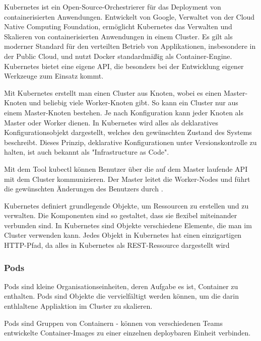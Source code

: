 {Kubernetes ist ein Open-Source-Orchestrierer für das Deployment von containerisierten Anwendungen. Entwickelt von Google, Verwaltet von der Cloud Native Computing Foundation, ermöglicht Kubernetes das Verwalten und Skalieren von containerisierten Anwendungen in einem Cluster. Es gilt als moderner Standard für den verteilten Betrieb von Applikationen, insbesondere in der Public Cloud, und nutzt Docker standardmäßig als Container-Engine. Kubernetes bietet eine eigene API, die besonders bei der Entwicklung eigener Werkzeuge zum Einsatz kommt.

Mit Kubernetes erstellt man einen Cluster aus Knoten, wobei es einen Master-Knoten und beliebig viele Worker-Knoten gibt. So kann ein Cluster nur aus einem Master-Knoten bestehen. Je nach Konfiguration kann jeder Knoten als Master oder Worker dienen. In Kubernetes wird alles als deklaratives Konfigurationsobjekt dargestellt, welches den gewünschten Zustand des Systems beschreibt. Dieses Prinzip, deklarative Konfigurationen unter Versionskontrolle zu halten, ist auch bekannt als "Infrastructure as Code".

Mit dem Tool kubectl können Benutzer über die auf dem Master laufende API mit dem Cluster kommunizieren. Der Master leitet die Worker-Nodes und führt die gewünschten Änderungen des Benutzers durch \cite[S.1,4]{burns1} \cite{burns3} \cite[S.79,81]{riti} \cite[S. 60-63,166]{stender}.

Kubernetes definiert grundlegende Objekte, um Ressourcen zu erstellen und zu verwalten. Die Komponenten sind so gestaltet, dass sie flexibel miteinander verbunden sind. In Kubernetes sind Objekte verschiedene Elemente, die man im Cluster verwenden kann. Jedes Objekt in Kubernetes hat einen einzigartigen HTTP-Pfad, da alles in Kubernetes als REST-Ressource dargestellt wird   \cite[S.40, 42]{burns1} \cite[S.80-81]{riti} \cite[S. 175]{stender}

\subsubsection{Pods}

Pods sind kleine Organisationseinheiten, deren Aufgabe es ist, Container zu enthalten. Pods sind Objekte die vervielfältigt werden können, um die darin enthlaltene Appliaktion im Cluster zu skalieren. \cite[S. 176]{stender}

Pods sind Gruppen von Containern - können von verschiedenen Teams entwickelte Container-Images zu einer einzelnen deploybaren Einheit verbinden. \cite[S.8]{burns1}

}
